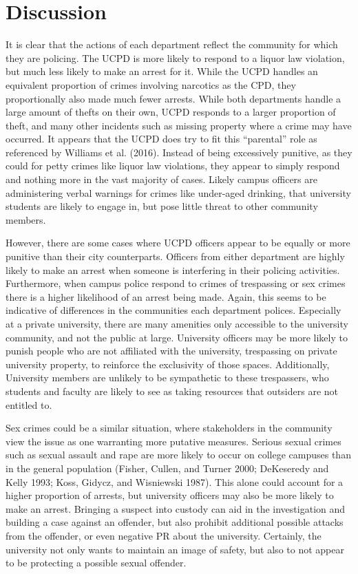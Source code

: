 \documentclass{ucetd}
\begin{document}
\hypertarget{discussion}{%
\chapter{Discussion}\label{discussion}}

It is clear that the actions of each department reflect the community
for which they are policing. The UCPD is more likely to respond to a
liquor law violation, but much less likely to make an arrest for it.
While the UCPD handles an equivalent proportion of crimes involving
narcotics as the CPD, they proportionally also made much fewer arrests.
While both departments handle a large amount of thefts on their own,
UCPD responds to a larger proportion of theft, and many other incidents
such as missing property where a crime may have occurred. It appears
that the UCPD does try to fit this ``parental'' role as referenced by
Williams et al. (2016). Instead of being excessively punitive, as they
could for petty crimes like liquor law violations, they appear to simply
respond and nothing more in the vast majority of cases. Likely campus
officers are administering verbal warnings for crimes like under-aged
drinking, that university students are likely to engage in, but pose
little threat to other community members.

However, there are some cases where UCPD officers appear to be equally
or more punitive than their city counterparts. Officers from either
department are highly likely to make an arrest when someone is
interfering in their policing activities. Furthermore, when campus
police respond to crimes of trespassing or sex crimes there is a higher
likelihood of an arrest being made. Again, this seems to be indicative
of differences in the communities each department polices. Especially at
a private university, there are many amenities only accessible to the
university community, and not the public at large. University officers
may be more likely to punish people who are not affiliated with the
university, trespassing on private university property, to reinforce the
exclusivity of those spaces. Additionally, University members are
unlikely to be sympathetic to these trespassers, who students and
faculty are likely to see as taking resources that outsiders are not
entitled to.

Sex crimes could be a similar situation, where stakeholders in the
community view the issue as one warranting more putative measures.
Serious sexual crimes such as sexual assault and rape are more likely to
occur on college campuses than in the general population (Fisher,
Cullen, and Turner 2000; DeKeseredy and Kelly 1993; Koss, Gidycz, and
Wisniewski 1987). This alone could account for a higher proportion of
arrests, but university officers may also be more likely to make an
arrest. Bringing a suspect into custody can aid in the investigation and
building a case against an offender, but also prohibit additional
possible attacks from the offender, or even negative PR about the
university. Certainly, the university not only wants to maintain an
image of safety, but also to not appear to be protecting a possible
sexual offender.
\end{document}

